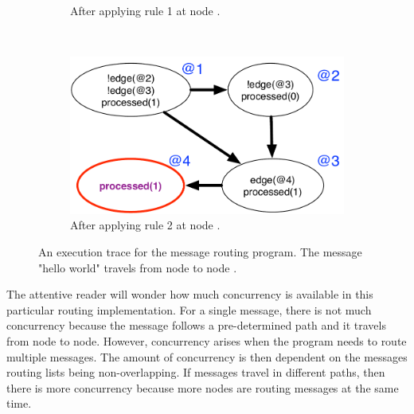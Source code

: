 \begin{figure}[h]
\begin{subfigure}[b]{\visitsize\textwidth}
                \caption{After applying rule 1 at node .}
                \label{fig:message_trace3}
        \end{subfigure}%
        ~
        \begin{subfigure}[b]{\visitsize\textwidth}
                  \includegraphics[width=\textwidth]{figures/message/message_trace4}
                  \caption{After applying rule 2 at node .}
                  \label{fig:message_trace4}
          \end{subfigure}
        \caption{An execution trace for the message routing program. The message "hello
        world" travels from node  to node .}\label{fig:message_trace}
\end{figure}

The attentive reader will wonder how much concurrency is available in this
particular routing implementation. For a single message, there is not much
concurrency because the message follows a pre-determined path and it travels
from node to node. However, concurrency arises when the program needs to route
multiple messages. The amount of concurrency is then dependent on the messages
routing lists being non-overlapping. If messages travel in different paths, then
there is more concurrency because more nodes are routing messages at the same
time.
